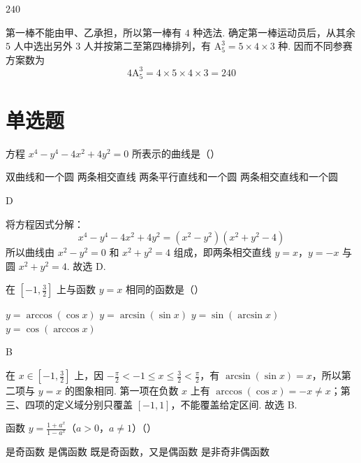 \documentclass[UTF8,a4paper,oneside,11pt]{ctexbook}
\begin{document}
\begin{answer}
\(240\)
\end{answer}

\begin{solution}
第一棒不能由甲、乙承担，所以第一棒有 \(4\) 种选法. 确定第一棒运动员后，从其余 \(5\) 人中选出另外 \(3\) 人并按第二至第四棒排列，有 \(\mathrm A_5^3=5\times4\times3\) 种. 因而不同参赛方案数为
\[
4\mathrm A_5^3=4\times5\times4\times3=240
\]
\end{solution}

\section{单选题}

\begin{problem}
方程 \(x^4-y^4-4x^2+4y^2=0\) 所表示的曲线是（\quad）

\choices
    {双曲线和一个圆}
    {两条相交直线}
    {两条平行直线和一个圆}
    {两条相交直线和一个圆}
\end{problem}

\begin{answer}
D
\end{answer}

\begin{solution}
将方程因式分解：
\[
x^4-y^4-4x^2+4y^2=(x^2-y^2)(x^2+y^2-4)
\]
所以曲线由 \(x^2-y^2=0\) 和 \(x^2+y^2=4\) 组成，即两条相交直线 \(y=x\)，\(y=-x\) 与圆 \(x^2+y^2=4\). 故选 D.
\end{solution}

\begin{problem}
在 \(\left[ -1,\frac{3}{2} \right]\) 上与函数 \(y=x\) 相同的函数是（\quad）

\choices
    {\(y=\arccos(\cos x)\)}
    {\(y=\arcsin(\sin x)\)}
    {\(y=\sin(\arcsin x)\)}
    {\(y=\cos(\arccos x)\)}
\end{problem}

\begin{answer}
B
\end{answer}

\begin{solution}
在 \(x\in[-1,\frac32]\) 上，因 \(-\frac\pi2<-1\leqslant x\leqslant\frac32<\frac\pi2\)，有 \(\arcsin(\sin x)=x\)，所以第二项与 \(y=x\) 的图象相同. 第一项在负数 \(x\) 上有 \(\arccos(\cos x)=-x\ne x\)；第三、四项的定义域分别只覆盖 \([-1,1]\)，不能覆盖给定区间. 故选 B.
\end{solution}

\begin{problem}
函数 \(y=\frac{1+a^x}{1-a^x}\)（\(a>0\)，\(a\ne1\)）（\quad）

\choices
    {是奇函数}
    {是偶函数}
    {既是奇函数，又是偶函数}
    {是非奇非偶函数}
\end{problem}
\end{document}
